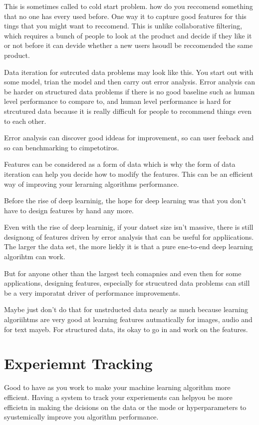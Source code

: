 This is sometimes called to cold start problem. how do you reccomend something that no one has every used before.
One way it to capture good features for this tings that you might want to reccomend.
This is unlike collaborative filtering, which requires a bunch of people to look at the product and decide if they like it or not before it can devide whether a new users hsoudl be reccomended the same product.


Data iteration for sutrcuted data problems may look like this.
You start out with some model, trian the model and then carry out error analysis.
Error analysis can be harder on structured data problems if there is no good baseline such as human level performance to compare to, and human level performance is hard for strcutured data because it is really difficult for people to recommend things even to each other.

Error analysis can discover good iddeas for improvement, so can user feeback and so can benchmarking to cimpetotiros.

Features can be considered as a form of data which is why the form of data iteration can help you decide how to modify the features.
This can be an efficient way of improving your lerarning algorithms performance.

Before the rise of deep learninig, the hope for deep learning was that you don't have to design features by hand any more.

Even with the rise of deep learninig, if your datset size isn't massive, there is still designong of features driven by error analysis that can be useful for appliications.
The larger the data set, the more liekly it is that a pure ene-to-end deep learning algorihtm can work.

But for anyone other than the largest tech comapnies and even then for some applications, designing features, especially for strucutred data problems can still be a very imporatnt driver of performance improvements.

Maybe just don't do that for unstrducted data nearly as much because learning algoriihtms are very good at learning features autmatically for images, audio and for text mayeb.
For structured data, its okay to go in and work on the features.


\section{Experiemnt Tracking}

Good to have as you work to make your machine learning algorithm more efficient.
Having a system to track your experiements can helpyou be more efficietn in making the dcisions on the data or the mode or hyperparameters to syustemically improve you algorithm performance.


